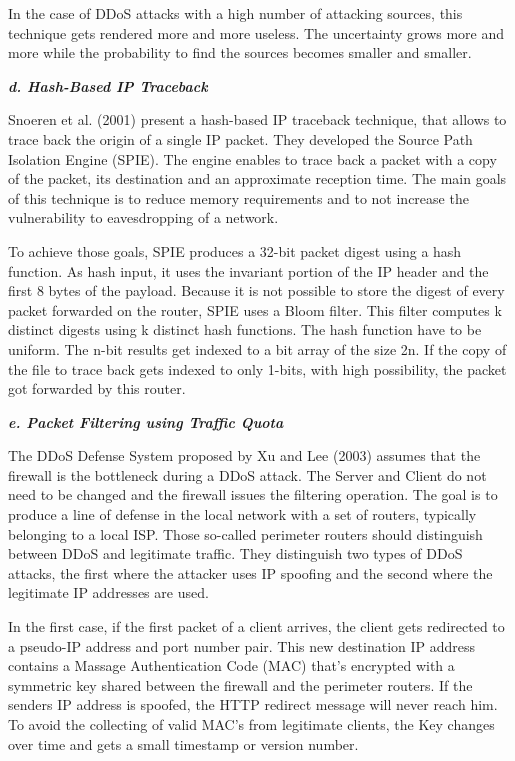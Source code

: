 In the case of DDoS attacks with a high number of attacking sources, this technique gets rendered more and more useless. The uncertainty grows more and more while the probability to find the sources becomes smaller and smaller. \cite{Park01}

\textbf{\textit{d. Hash-Based IP Traceback}}

Snoeren et al. (2001) present a hash-based IP traceback technique, that allows to trace back the origin of a single IP packet. They developed the Source Path Isolation Engine (SPIE). The engine enables to trace back a packet with a copy of the packet, its destination and an approximate reception time. The main goals of this technique is to reduce memory requirements and to not increase the vulnerability to eavesdropping of a network.

To achieve those goals, SPIE produces a 32-bit packet digest using a hash function. As hash input, it uses the invariant portion of the IP header and the first 8 bytes of the payload. Because it is not possible to store the digest of every packet forwarded on the router, SPIE uses a Bloom filter. This filter computes k distinct digests using k distinct hash functions. The hash function have to be uniform. The n-bit results get indexed to a bit array of the size 2n. If the copy of the file to trace back gets indexed to only 1-bits, with high possibility, the packet got forwarded by this router. \cite{Snoeren01}

\textbf{\textit{e. Packet Filtering using Traffic Quota}}

The DDoS Defense System proposed by Xu and Lee (2003) assumes that the firewall is the bottleneck during a DDoS attack. The Server and Client do not need to be changed and the firewall issues the filtering operation. The goal is to produce a line of defense in the local network with a set of routers, typically belonging to a local ISP. Those so-called perimeter routers should distinguish between DDoS and legitimate traffic. They distinguish two types of DDoS attacks, the first where the attacker uses IP spoofing and the second where the legitimate IP addresses are used.

In the first case, if the first packet of a client arrives, the client gets redirected to a pseudo-IP address and port number pair. This new destination IP address contains a Massage Authentication Code (MAC) that's encrypted with a symmetric key shared between the firewall and the perimeter routers. If the senders IP address is spoofed, the HTTP redirect message will never reach him.
To avoid the collecting of valid MAC's from legitimate clients, the Key changes over time and gets a small timestamp or version number.

